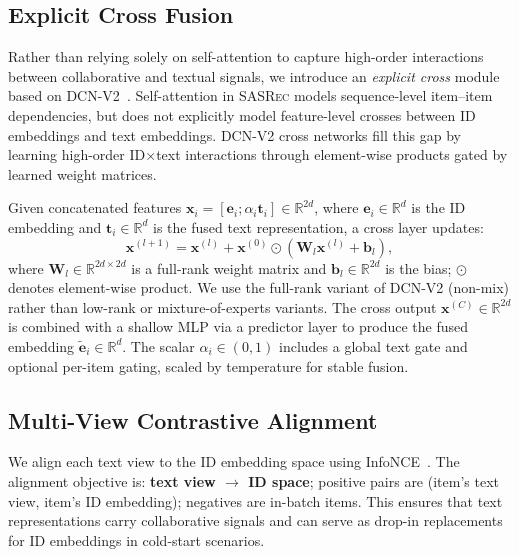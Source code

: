 \documentclass[sigconf,natbib=true,anonymous]{acmart}
\newcommand{\base}{\textsc{SASRec}\xspace}
\newcommand{\InfoNCE}{InfoNCE\xspace}
\begin{document}
\subsection{Explicit Cross Fusion}\label{sec:cross}
Rather than relying solely on self-attention to capture
high-order interactions between collaborative and textual
signals, we introduce an \emph{explicit cross} module based on
DCN-V2~\cite{wang2021dcnv2}. Self-attention in \base models
sequence-level item--item dependencies, but does not
explicitly model feature-level crosses between ID embeddings
and text embeddings. DCN-V2 cross networks fill this gap by
learning high-order ID$\times$text interactions through
element-wise products gated by learned weight matrices.

Given concatenated features
$\mathbf{x}_i=[\mathbf{e}_i;\alpha_i \mathbf{t}_i] \in \mathbb{R}^{2d}$, where
$\mathbf{e}_i \in \mathbb{R}^d$ is the ID embedding and $\mathbf{t}_i \in \mathbb{R}^d$ is the
fused text representation, a cross layer updates:
\begin{equation}
  \mathbf{x}^{(l+1)} = \mathbf{x}^{(l)} + \mathbf{x}^{(0)} \odot (\mathbf{W}_l\mathbf{x}^{(l)} + \mathbf{b}_l),
\end{equation}
where $\mathbf{W}_l \in \mathbb{R}^{2d \times 2d}$ is a
full-rank weight matrix and $\mathbf{b}_l \in \mathbb{R}^{2d}$ is the bias;
$\odot$ denotes element-wise product. We use the full-rank variant of DCN-V2 (non-mix)
rather than low-rank or mixture-of-experts variants. The
cross output $\mathbf{x}^{(C)} \in \mathbb{R}^{2d}$ is combined with a shallow MLP via a predictor
layer to produce the fused embedding $\tilde{\mathbf{e}}_i \in \mathbb{R}^d$.
The scalar $\alpha_i \in (0,1)$ includes a global text gate and
optional per-item gating, scaled by temperature for stable
fusion.

\subsection{Multi-View Contrastive Alignment}\label{sec:align}
We align each text view to the ID embedding space using
\InfoNCE~\cite{oord2018cpc}. The alignment objective is:
\textbf{text view $\to$ ID space}; positive pairs are
(item's text view, item's ID embedding); negatives are
in-batch items. This ensures that text representations
carry collaborative signals and can serve as drop-in
replacements for ID embeddings in cold-start scenarios.
\end{document}
